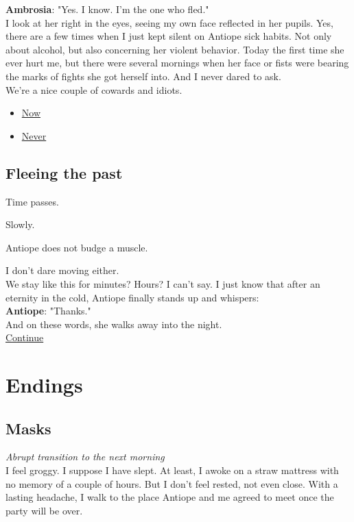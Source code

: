 \documentclass{report}
\newcommand{\dcomment}[1]{
	\emph{#1}
	\\
}
\newcommand{\speaker}[1]{
	\textbf{#1}: 
}
\newcommand{\glink}[2]{
	\hyperref[#1]{#2}
}
\newcommand{\gsection}[1]{
	\section*{#1}
	\label{#1}
}
\begin{document}
\speaker{Ambrosia} "Yes. I know. I'm the one who fled."\\

I look at her right in the eyes, seeing my own face reflected in her pupils. Yes, there are a few times when I just kept silent on Antiope sick habits. Not only about alcohol, but also concerning her violent behavior. Today the first time she ever hurt me, but there were several mornings when her face or fists were bearing the marks of fights she got herself into. And I never dared to ask.\\

We're a nice couple of cowards and idiots.\\

\begin{itemize}
	\item \glink{Declaration}{Now}
	\item \glink{Friends}{Never}
\end{itemize}

\gsection{Fleeing the past}

Time passes.

Slowly.

Antiope does not budge a muscle.

I don't dare moving either.\\

We stay like this for minutes? Hours? I can't say. I just know that after an eternity in the cold, Antiope finally stands up and whispers:\\

\speaker{Antiope} "Thanks."\\

And on these words, she walks away into the night.\\

\glink{Masks}{Continue}

\chapter*{Endings}

\gsection{Masks}

\dcomment{
	Abrupt transition to the next morning
}

I feel groggy. I suppose I have slept. At least, I awoke on a straw mattress with no memory of a couple of hours. But I don't feel rested, not even close. With a lasting headache, I walk to the place Antiope and me agreed to meet once the party will be over.\\
\end{document}
